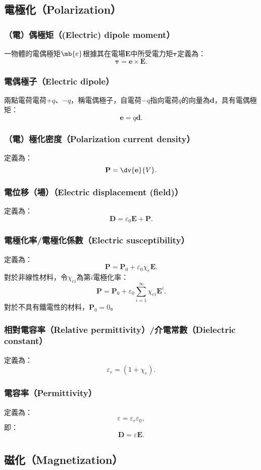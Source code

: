 \documentclass[a4paper,12pt]{report}
\begin{document}
\begin{itemize}
\subsection{電極化（Polarization）}
\subsubsection{（電）偶極矩（(Electric) dipole moment）}
一物體的電偶極矩$\mb{e}$根據其在電場$\mathbf{E}$中所受電力矩$\boldsymbol{\tau}$定義為：
\[\boldsymbol{\tau} = \mathbf{e} \times \mathbf{E}.\]
\subsubsection{電偶極子（Electric dipole）}
兩點電荷電荷$+q$、$-q$，稱電偶極子，自電荷$-q$指向電荷$q$的向量為$\mathbf{d}$，具有電偶極矩：
\[\mathbf{e}=q\mathbf{d}.\]
\subsubsection{（電）極化密度（Polarization current density）}
定義為：
\[\mathbf{P}=\dv{\mathbf{e}}{V}.\]
\subsubsection{電位移（場）（Electric displacement (field)）}
定義為：
\[\mathbf{D} = \varepsilon_0 \mathbf{E} + \mathbf{P}.\]
\subsubsection{電極化率/電極化係數（Electric susceptibility）}
定義為：
\[\mathbf{P}=\mathbf{P}_0+\varepsilon_0\chi_e\mathbf{E}.\]
對於非線性材料，令$\chi_{ei}$為第$i$電極化率：
\[\mathbf{P}=\mathbf{P}_0+\varepsilon_0\sum_{i=1}^{\infty}\chi_{ei}\mathbf{E}^i.\]
對於不具有鐵電性的材料，$\mathbf{P}_0=0$。
\subsubsection{相對電容率（Relative permittivity）/介電常數（Dielectric constant）}
定義為：
\[\varepsilon_r=(1+\chi_e).\]
\subsubsection{電容率（Permittivity）}
定義為：
\[\varepsilon=\varepsilon_r\varepsilon_0,\]
即：
\[\mathbf{D} = \varepsilon\mathbf{E}.\]
\subsection{磁化（Magnetization）}

\end{itemize}
\end{document}
